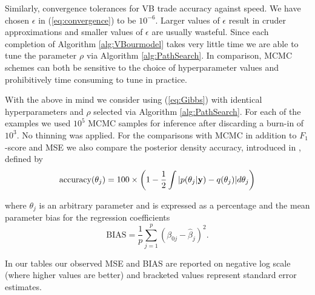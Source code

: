 \documentclass[11pt]{article}
\newtheorem{Main Result}{Main Result}
\def\vectorfontone{\bf}
\def\vectorfonttwo{\boldsymbol}
\def\vy{{\vectorfontone y}}                      %
\def\vbeta{{\vectorfonttwo \beta}}               %
\def\vmu{{\vectorfonttwo \mu}}                   %
\def\bE{{\mathbb E}}                             %
\begin{document}
Similarly, convergence tolerances for VB trade accuracy against speed. We have
chosen $\epsilon$ in (\ref{eq:convergence}) to be $10^{-6}$. Larger values of
$\epsilon$ result in cruder approximations and smaller values of $\epsilon$
are usually wasteful. Since each completion of Algorithm \ref{alg:VBourmodel}
takes very little time we are able to tune the parameter $\rho$ via
Algorithm \ref{alg:PathSearch}. In comparison, MCMC schemes can both be
sensitive to the choice of hyperparameter values and prohibitively time
consuming to tune in practice.

With the above in mind we consider using (\ref{eq:Gibbs}) with identical
hyperparameters and $\rho$ selected via Algorithm \ref{alg:PathSearch}. For
each of the  examples we used $10^5$ MCMC samples for inference
after discarding a burn-in of $10^3$. No thinning was applied.
%
For the comparisons with MCMC in addition to
$F_1$-score and MSE we also compare the
posterior density accuracy,
introduced in \cite{FaesEtal2011}, defined by
$$
\mbox{accuracy}(\theta_j) = 100 \times \left( 1 - \frac{1}{2}\int |p(\theta_j|\vy) - q(\theta_j)| d\theta_j \right)
$$

\noindent where $\theta_j$ is an arbitrary parameter and is expressed as a
percentage and the mean parameter bias for the regression coefficients
$$
\mbox{BIAS} = \frac{1}{p}\sum_{j=1}^p (\beta_{0j} - \widehat{\beta}_j)^2.
$$

%

\noindent In our tables our observed MSE and BIAS are reported on negative
log scale (where higher values are better) and bracketed values represent
standard error estimates.
\end{document}

